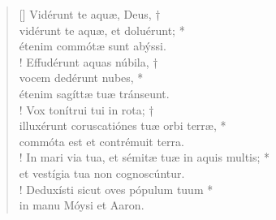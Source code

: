 \begin{verse}[\versewidth]
\vin Vidérunt te aquæ, Deus, †\\
\vin vidérunt te aquæ, et doluérunt; *\\
\vin étenim commótæ sunt abýssi.\\!
Effudérunt aquas núbila, †\\
vocem dedérunt nubes, *\\
étenim sagíttæ tuæ tránseunt.\\!
\vin Vox tonítrui tui in rota; †\\
\vin illuxérunt coruscatiónes tuæ orbi terræ, *\\
\vin commóta est et contrémuit terra.\\!
In mari via tua, et sémitæ tuæ in aquis multis; *\\
et vestígia tua non cognoscúntur.\\!
\vin Deduxísti sicut oves pópulum tuum *\\
\vin in manu Móysi et Aaron.\\
\end{verse}
\vspace{1cm}


